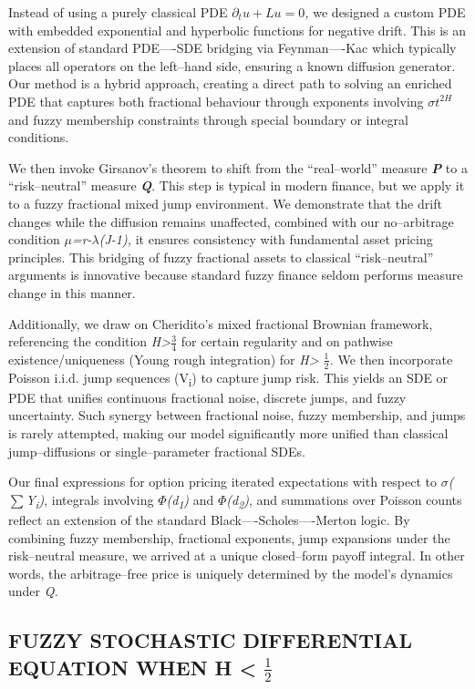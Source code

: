 \documentclass[12pt,a4paper]{report}
\numberwithin{equation}{section}
\begin{document}
Instead of using a purely classical PDE
\(\partial_{t}u + Lu = 0\)\emph{,} we designed a custom PDE with
embedded exponential and hyperbolic functions for negative drift. This
is an extension of standard PDE----SDE bridging via Feynman----Kac which
typically places all operators on the left--hand side, ensuring a known
diffusion generator. Our method is a hybrid approach, creating a direct
path to solving an enriched PDE that captures both fractional behaviour
through exponents involving \(\sigma t^{2H}\) and fuzzy membership
constraints through special boundary or integral conditions.

We then invoke Girsanov's theorem to shift from the ``real--world''
measure \emph{\textbf{P}} to a ``risk--neutral'' measure
\emph{\textbf{Q}}. This step is typical in modern finance, but we apply
it to a fuzzy fractional mixed jump environment. We demonstrate that the
drift changes while the diffusion remains unaffected, combined with our
no--arbitrage condition \emph{$\mu$=r-$\lambda$(J-1),} it ensures consistency with
fundamental asset pricing principles. This bridging of fuzzy fractional
assets to classical ``risk--neutral'' arguments is innovative because
standard fuzzy finance seldom performs measure change in this manner.

Additionally, we draw on Cheridito's mixed fractional Brownian
framework, referencing the condition \emph{H\textgreater$\frac{3}{4}$} for certain
regularity and on pathwise existence/uniqueness (Young rough
integration) for \emph{H\textgreater{} $\frac{1}{2}$.} We then incorporate Poisson
i.i.d. jump sequences (V\textsubscript{i}) to capture jump risk. This
yields an SDE or PDE that unifies continuous fractional noise, discrete
jumps, and fuzzy uncertainty. Such synergy between fractional noise,
fuzzy membership, and jumps is rarely attempted, making our model
significantly more unified than classical jump--diffusions or
single--parameter fractional SDEs.

Our final expressions for option pricing iterated expectations with
respect to \emph{$\sigma$($\sum$Y\textsubscript{i})}, integrals involving
\emph{$\Phi$(d\textsubscript{1})} and \emph{$\Phi$(d\textsubscript{2})}, and
summations over Poisson counts reflect an extension of the standard
Black----Scholes----Merton logic. By combining fuzzy membership, fractional
exponents, jump expansions under the risk--neutral measure, we arrived at
a unique closed--form payoff integral. In other words, the arbitrage--free
price is uniquely determined by the model's dynamics under \emph{Q.}
\hypertarget{fuzzy-sde-h-lt-half}{%
\subsection{\texorpdfstring{FUZZY STOCHASTIC DIFFERENTIAL EQUATION
WHEN H \textless{} $\frac{1}{2}$
}{FUZZY STOCHASTIC DIFFERENTIAL EQUATION WHEN H < 1/2}}\label{fuzzy-sde-h-lt-half}}
\end{document}
